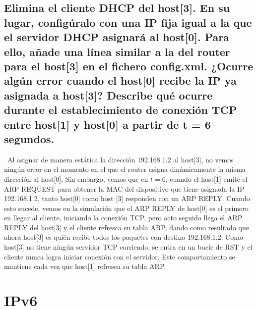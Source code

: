 \subsection{Elimina el cliente DHCP del host[3]. En su lugar, configúralo con una IP fija igual a la que el servidor DHCP asignará al host[0]. Para ello, añade una línea similar a la del router para el host[3] en el fichero config.xml. ¿Ocurre algún error cuando el host[0] recibe la IP ya asignada a host[3]? Describe qué ocurre durante el establecimiento de conexión TCP entre host[1] y host[0] a partir de t = 6 segundos.}
\begin{flushleft}\
Al asignar de manera estática la dirección 192.168.1.2 al host[3], no vemos ningún error en el momento en el que el router asigna dinámicamente la misma dirección al host[0]. Sin embargo, vemos que en \(t=6\), cuando el host[1] emite el ARP REQUEST para obtener la MAC del dispositivo que tiene asignada la IP 192.168.1.2, tanto host[0] como host [3] responden con un ARP REPLY. Cuando esto sucede, vemos en la simulación que el ARP REPLY de host[0] es el primero en llegar al cliente, iniciando la conexión TCP, pero acto seguido llega el ARP REPLY del host[3] y el cliente refresca su tabla ARP, dando como resultado que ahora host[3] es quién recibe todos los paquetes con destino 192.168.1.2. Como host[3] no tiene ningún servidor TCP corriendo, se entra en un bucle de RST y el cliente nunca logra iniciar conexión con el servidor. Este comportamiento se mantiene cada vez que host[1] refresca su tabla ARP.
\end{flushleft}
\section{IPv6}
